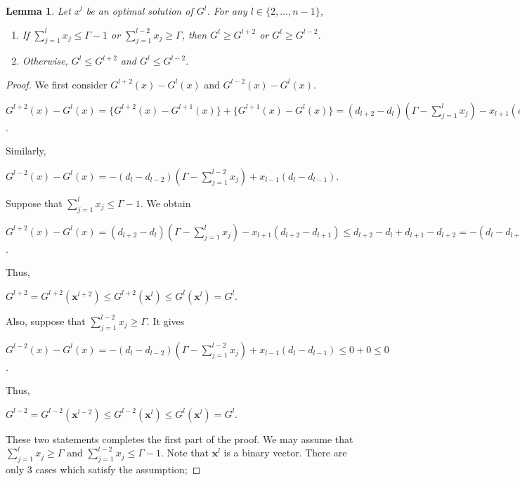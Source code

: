 \documentclass[letterpaper, 10pt]{article}
\newtheorem{lemma}{Lemma}
\renewcommand{\vec}[1]{\bm{#1}}
\begin{document}
\begin{lemma} \label{lem:new_prop}
	Let $x^{l}$ be an optimal solution of $G^{l}$. For any $l \in \{2, \ldots, n-1 \}$,
	\begin{enumerate}
		\item If $\sum_{j=1}^{l}{x_{j}} \le \Gamma - 1$ or $\sum_{j=1}^{l-2}{x_{j}} \ge \Gamma$, then $G^{l} \ge G^{l+2}$ or $G^{l} \ge G^{l-2}$.
		\item Otherwise, $G^{l} \le G^{l+2}$ and $G^{l} \le G^{l-2}$.
	\end{enumerate}
\end{lemma}
\begin{proof}
	We first consider $G^{l+2}(x) - G^{l}(x)$ and $G^{l-2}(x) - G^{l}(x)$.
	\begin{center}
		$G^{l+2}(x) - G^{l}(x) = \{ G^{l+2}(x) - G^{l+1}(x) \} + \{ G^{l+1}(x) - G^{l}(x) \} = (d_{l+2} - d_{l}) \left( \Gamma - \sum\limits_{j=1}^{l}{x_{j}} \right) - x_{l+1}(d_{l+2} - d_{l+1})$.
	\end{center}
	Similarly,
	\begin{center}
		$G^{l-2}(x) - G^{l}(x) = -(d_{l} - d_{l-2}) \left( \Gamma - \sum\limits_{j=1}^{l-2}{x_{j}} \right) + x_{l-1}(d_{l} - d_{l-1})$.
	\end{center}
	Suppose that $\sum_{j=1}^{l}{x_{j}} \le \Gamma - 1$. We obtain
	\begin{center}
		$G^{l+2}(x) - G^{l}(x) 
		= (d_{l+2} - d_{l}) \left( \Gamma - \sum\limits_{j=1}^{l}{x_{j}} \right) - x_{l+1}(d_{l+2} - d_{l+1})
		\le d_{l+2} - d_{l} + d_{l+1} - d_{l+2} = -(d_{l} - d_{l+1}) \le 0$.
	\end{center}
	Thus,
	\begin{center}
		$G^{l+2} = G^{l+2}(\vec{x}^{l+2}) \le G^{l+2}(\vec{x}^{l}) \le G^{l}(\vec{x}^{l}) = G^{l}$.
	\end{center}
	Also, suppose that $\sum_{j=1}^{l-2}{x_{j}} \ge \Gamma$. It gives
	\begin{center}
		$G^{l-2}(x) - G^{l}(x) 
		= -(d_{l} - d_{l-2}) \left( \Gamma - \sum\limits_{j=1}^{l-2}{x_{j}} \right) + x_{l-1}(d_{l} - d_{l-1})
		\le 0+0 \le 0$.
	\end{center}
	Thus,
	\begin{center}
		$G^{l-2} = G^{l-2}(\vec{x}^{l-2}) \le G^{l-2}(\vec{x}^{l}) \le G^{l}(\vec{x}^{l}) = G^{l}$.
	\end{center}
	These two statements completes the first part of the proof. 
	We may assume that $\sum\limits_{j=1}^{l}{x_{j}} \ge \Gamma$ and $\sum\limits_{j=1}^{l-2}{x_{j}} \le \Gamma-1$.
	Note that $\vec{x}^{l}$ is a binary vector. There are only 3 cases which satisfy the assumption;

\end{proof}
\end{document}
